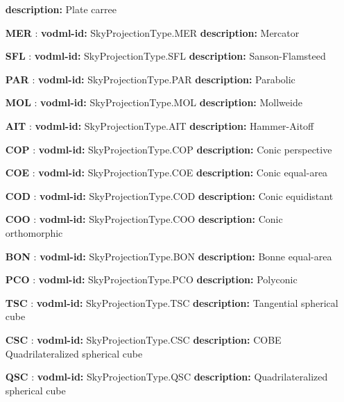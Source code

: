 \begin{itemize}
          \textbf{description:} Plate carree
    \item[\textbf{MER}]: \textbf{vodml-id:} SkyProjectionType.MER \newline
          \textbf{description:} Mercator
    \item[\textbf{SFL}]: \textbf{vodml-id:} SkyProjectionType.SFL \newline
          \textbf{description:} Sanson-Flamsteed
    \item[\textbf{PAR}]: \textbf{vodml-id:} SkyProjectionType.PAR \newline
          \textbf{description:} Parabolic
    \item[\textbf{MOL}]: \textbf{vodml-id:} SkyProjectionType.MOL \newline
          \textbf{description:} Mollweide
    \item[\textbf{AIT}]: \textbf{vodml-id:} SkyProjectionType.AIT \newline
          \textbf{description:} Hammer-Aitoff
    \item[\textbf{COP}]: \textbf{vodml-id:} SkyProjectionType.COP \newline
          \textbf{description:} Conic perspective
    \item[\textbf{COE}]: \textbf{vodml-id:} SkyProjectionType.COE \newline
          \textbf{description:} Conic equal-area
    \item[\textbf{COD}]: \textbf{vodml-id:} SkyProjectionType.COD \newline
          \textbf{description:} Conic equidistant
    \item[\textbf{COO}]: \textbf{vodml-id:} SkyProjectionType.COO \newline
          \textbf{description:} Conic orthomorphic
    \item[\textbf{BON}]: \textbf{vodml-id:} SkyProjectionType.BON \newline
          \textbf{description:} Bonne equal-area
    \item[\textbf{PCO}]: \textbf{vodml-id:} SkyProjectionType.PCO \newline
          \textbf{description:} Polyconic
    \item[\textbf{TSC}]: \textbf{vodml-id:} SkyProjectionType.TSC \newline
          \textbf{description:} Tangential spherical cube
    \item[\textbf{CSC}]: \textbf{vodml-id:} SkyProjectionType.CSC \newline
          \textbf{description:} COBE Quadrilateralized spherical cube
    \item[\textbf{QSC}]: \textbf{vodml-id:} SkyProjectionType.QSC \newline
          \textbf{description:} Quadrilateralized spherical cube
  \end{itemize}
  \normalsize

